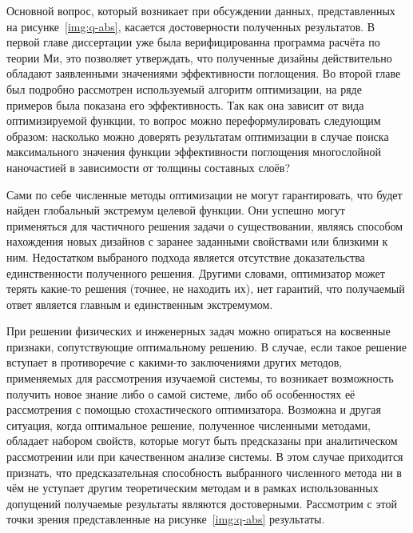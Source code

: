 Основной вопрос, который возникает при обсуждении данных,
представленных на рисунке~\ref{img:q-abs}, касается достоверности
полученных результатов.  В первой главе диссертации уже была
верифицированна программа расчёта по теории Ми, это позволяет
утверждать, что полученные дизайны действительно обладают заявленными
значениями эффективности поглощения.  Во второй главе был подробно
рассмотрен используемый алгоритм оптимизации, на ряде примеров была
показана его эффективность.  Так как она зависит от вида
оптимизируемой функции, то вопрос можно переформулировать следующим
образом: насколько можно доверять результатам оптимизации в случае
поиска максимального значения функции эффективности поглощения
многослойной наночастией в зависимости от толщины составных слоёв?

Сами по себе численные методы оптимизации не могут гарантировать, что
будет найден глобальный экстремум целевой функции. Они успешно
могут применяться для частичного решения задачи о существовании,
являясь способом нахождения новых дизайнов с заранее заданными
свойствами или близкими к ним.  Недостатком выбраного подхода является
отсутствие доказательства единственности полученного решения.  Другими
словами, оптимизатор может терять какие-то решения (точнее, не
находить их), нет гарантий, что получаемый ответ является главным и
единственным экстремумом.

При решении физических и инженерных задач можно опираться на косвенные
признаки, сопутствующие оптимальному решению.  В случае, если такое
решение вступает в противоречие с какими-то заключениями других
методов, применяемых для рассмотрения изучаемой системы, то возникает
возможность получить новое знание либо о самой системе, либо об
особенностях её рассмотрения с помощью стохастического
оптимизатора. Возможна и другая ситуация, когда оптимальное решение,
полученное численными методами, обладает набором свойств, которые
могут быть предсказаны при аналитическом рассмотрении или при
качественном анализе системы. В этом случае приходится признать, что
предсказательная способность выбранного численного метода ни в чём не
уступает другим теоретическим методам и в рамках использованных
допущений получаемые результаты являются достоверными. Рассмотрим с
этой точки зрения представленные на рисунке~\ref{img:q-abs}
результаты.

